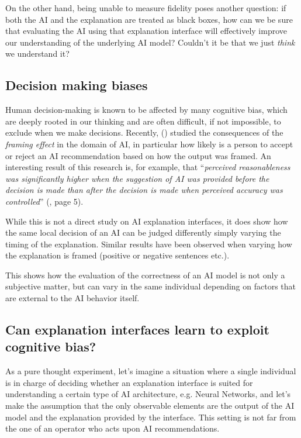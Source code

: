 \documentclass[conference]{IEEEtran}
\begin{document}
On the other hand, being unable to measure fidelity poses another question: if
both the AI and the explanation are treated as black boxes, how can we be sure
that evaluating the AI using that explanation interface will effectively improve
our understanding of the underlying AI model? Couldn't it be that we just
\textit{think} we understand it?

\subsection{Decision making biases}
\label{sec:bias}

Human decision-making is known to be affected by many cognitive bias, which are
deeply rooted in our thinking and are often difficult, if not impossible, to
exclude when we make decisions. Recently, (\cite{framingeffect}) studied the
consequences of the \textit{framing effect} in the domain of AI, in particular
how likely is a person to accept or reject an AI recommendation based on how the
output was framed. An interesting result of this research is, for example, that
``\textit{perceived reasonableness was significantly higher when the suggestion
    of AI was provided before the decision is made than after the decision is made
    when perceived accuracy was controlled}'' (\cite{framingeffect}, page 5).

While this is not a direct study on AI explanation interfaces, it does show how
the same local decision of an AI can be judged differently simply varying the
timing of the explanation. Similar results have been observed when varying how the explanation is framed (positive or negative sentences etc.).

This shows how the evaluation of the correctness of an AI model is not
only a subjective matter, but can vary in the same individual depending on
factors that are external to the AI behavior itself.

\subsection{Can explanation interfaces learn to exploit cognitive bias?}
\label{sec:exploit}

As a pure thought experiment, let's imagine a situation where a single
individual is in charge of deciding whether an explanation interface is suited
for understanding a certain type of AI architecture, e.g. Neural Networks, and
let's make the assumption that the only observable elements are the output of
the AI model and the explanation provided by the interface. This setting is not
far from the one of an operator who acts upon AI recommendations.
\end{document}

